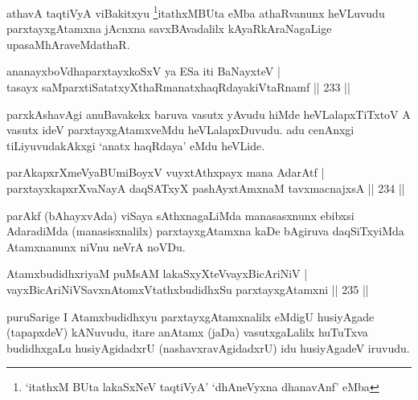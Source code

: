 \begin{artha}
athavA taqtiVyA viBakitxyu \footnote{`itathxM BUta lakaSxNeV taqtiVyA' `dhAneVyxna dhanavAnf' eMba}itathxMBUta eMba athaRvanunx heVLuvudu parxtayxgAtamxna jAcnxna savxBAvadalilx kAyaRkAraNagaLige upasaMhAraveMdathaR.
\end{artha}

\begin{shl}
ananayxboVdhaparxtayxkoSxV ya ESa iti BaNayxteV |\\
tasayx saMparxtiSatatxyXthaRmanatxhaqRdayakiVtaRnamf \hfill || 233 ||
\end{shl}

\begin{artha}
parxkAshavAgi anuBavakekx baruva vasutx yAvudu hiMde heVLalapxTiTxtoV A vasutx ideV parxtayxgAtamxveMdu heVLalapxDuvudu. adu cenAnxgi tiLiyuvudakAkxgi `anatx haqRdaya' eMdu heVLide.
\end{artha}


\begin{shl}
parAkapxrXmeVyaBUmiBoyxV vuyxtAthxpayx mana AdarAtf |\\
parxtayxkapxrXvaNayA daqSATxyX pashAyx\s \s tAmxnaM tavxmacnajxsA \hfill || 234 ||
\end{shl}

\begin{artha}
parAkf (bAhayxvAda) viSaya sAthxnagaLiMda manasasxnunx ebibxsi AdaradiMda (manasisxnalilx) parxtayxgAtamxna kaDe bAgiruva daqSiTxyiMda Atamxnanunx niVnu neVrA noVDu.
\end{artha}


\begin{shl}
AtamxbudidhxriyaM puMsAM lakaSxyXteV\s vayxBicAriNiV |\\
vayxBicAriNiVSavxnAtomxVtathxbudidhxSu parxtayxgAtamxni \hfill || 235 ||
\end{shl}

\begin{artha}
puruSarige I Atamxbudidhxyu parxtayxgAtamxnalilx eMdigU husiyAgade (tapapxdeV) kANuvudu, itare anAtamx (jaDa) vasutxgaLalilx huTuTxva budidhxgaLu husiyAgidadxrU (nashavxravAgidadxrU) idu husiyAgadeV iruvudu.
\end{artha}


